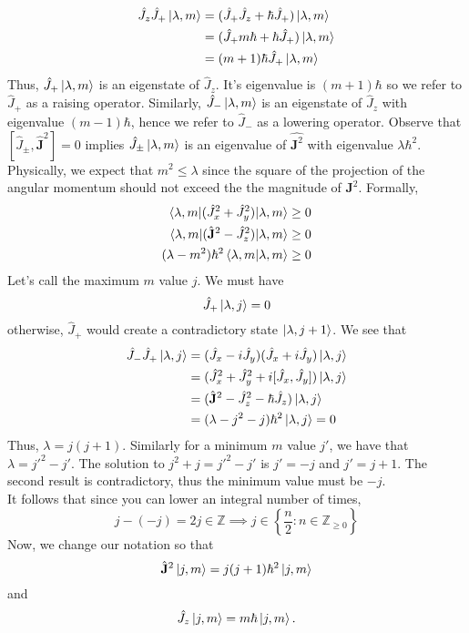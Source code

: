 \documentclass{report}
\begin{document}
\begin{align*}
	\hat J_z \hat J_+ \ket{\lambda, m} &= (\hat J_+ \hat J_z + \hbar \hat J_+) \ket{\lambda, m}\\
					   &= (\hat J_+ m \hbar + \hbar \hat J_+) \ket{\lambda, m}\\
					   &=(m+1)\hbar \hat J_+ \ket{\lambda, m}
\end{align*}
Thus, \(\hat J_+ \ket{\lambda, m}\) is an eigenstate of \(\hat J_z\). It's eigenvalue is \((m+1) \hbar\) so we refer to \(\hat J_+\) as a raising operator. Similarly, \(\hat J_- \ket{\lambda, m}\) is an eigenstate of \(\hat J_z\) with eigenvalue \((m-1) \hbar\), hence we refer to \(\hat J_-\) as a lowering operator. Observe that \([\hat J _\pm , \hat{\mathbf J}^2 ] = 0\) implies \(\hat J _ \pm \ket{\lambda, m}\) is an eigenvalue of \(\hat{\mathbf J^2}\) with eigenvalue \(\lambda \hbar ^2\). \\
Physically, we expect that \(m^2 \leq \lambda\) since the square of the projection of the angular momentum should not exceed the the magnitude of \(\mathbf J^2\). Formally, 
\begin{align*}
	\braket{\lambda, m | (\hat J_x^2 + \hat J_y ^ 2) | \lambda, m} &\geq 0\\
	\braket{\lambda, m | (\hat{\mathbf J}^2 - \hat J_z^2 )| \lambda, m} & \geq 0\\
	(\lambda - m^2) \hbar ^2 \braket{\lambda, m | \lambda, m} &\geq 0
\end{align*}
Let's call the maximum \(m\) value \(j\). We must have 
\[
\hat J_+ \ket{\lambda, j} = 0
\] 
otherwise, \(\hat J_+\) would create a contradictory state \(\ket{\lambda, j+ 1}\). We see that 
\begin{align*}
	\hat J_- \hat J_+ \ket{\lambda, j} &= (\hat J_x - i \hat J_y) (\hat J_x + i \hat J _y) \ket{\lambda, j} \\
					   &=(\hat J _x^2 + \hat J_y ^2 +i [\hat J_x, \hat J_y] )\ket{\lambda, j}\\
					   &=(\hat{\mathbf J}^2 - \hat J_z^2 -\hbar \hat J_z)\ket{\lambda, j}\\
					   &=(\lambda - j^2 - j) \hbar ^2 \ket{\lambda, j} = 0
\end{align*}
Thus, \(\lambda = j(j+1)\). Similarly for a minimum \(m\) value \(j'\), we have that \(\lambda = j'^2 - j'\). The solution to \(j^2 + j = j'^2 - j'\) is \(j' = -j\) and \(j' = j + 1\). The second result is contradictory, thus the minimum value must be \(-j\).  \\
It follows that since you can lower an integral number of times, 
\[
j - (-j) = 2j \in \mathbb Z \implies j \in \left\{\frac{n}{2} : n \in \mathbb Z _{\geq 0}\right\}
\] 
Now, we change our notation so that
\[
\hat{\mathbf J}^2 \ket{j, m} = j(j+1)\hbar ^2 \ket{j, m}
\]
and 
\[
\hat J_z \ket{j, m} = m\hbar \ket{j, m}.
\] 
\end{document}
